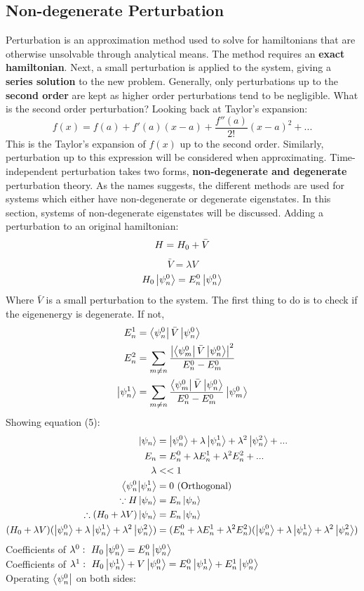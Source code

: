 \documentclass{article}
\begin{document}
\begin{flushleft}
\subsection{Non-degenerate Perturbation}
Perturbation is an approximation method used to solve for hamiltonians that are otherwise unsolvable through analytical means. The method requires an \textbf{exact hamiltonian}. Next, a small perturbation is applied to the system, giving a \textbf{series solution} to the new problem. Generally, only perturbations up to the \textbf{second order} are kept as higher order perturbations tend to be negligible. What is the second order perturbation? Looking back at Taylor's expansion:
$$f(x)=f(a)+f'(a)(x-a)+\frac{f''(a)}{2!}(x-a)^2+...$$
This is the Taylor's expansion of $f(x)$ up to the second order. Similarly, perturbation up to this expression will be considered when approximating. Time-independent perturbation takes two forms, \textbf{non-degenerate and degenerate} perturbation theory. As the names suggests, the different methods are used for systems which either have non-degenerate or degenerate eigenstates. In this section, systems of non-degenerate eigenstates will be discussed. Adding a perturbation to an original hamiltonian:
$$H=H_0+\Bar{V}$$
$$\bar{V}=\lambda V$$
$$H_0\ket{\psi_n^0}=E_n^0\ket{\psi_n^0}$$
Where $\bar{V}$ is a small perturbation to the system. The first thing to do is to check if the eigenenergy is degenerate. If not,
\begin{align}
    E_n^1&=\bra{\psi_n^0}\Bar{V}\ket{\psi_n^0}\\
    E_n^2&=\sum_{m\neq n}\frac{\abs{\bra{\psi_m^0}\bar{V}\ket{\psi_n^0}}^2}{E_n^0-E_m^0}\\
    \ket{\psi_n^1}&=\sum_{m\neq n}\frac{\bra{\psi_m^0}\bar{V}\ket{\psi_n^0}}{E_n^0-E_m^0}\ket{\psi_m^0}
\end{align}
Showing equation (5):
\begin{align*}
    \ket{\psi_n}&=\ket{\psi_n^0}+\lambda\ket{\psi_n^1}+\lambda^2\ket{\psi_n^2}+...\\
    E_n&=E_n^0+\lambda E_n^1+\lambda^2 E_n^2+...\\
    \lambda&<<1\\
    \bra{\psi_n^0}\ket{\psi_n^1}&=0\ \text{(Orthogonal)}\\
    \because H\ket{\psi_n}&=E_n\ket{\psi_n}\\
    \therefore (H_0+\lambda V)\ket{\psi_n}&=E_n\ket{\psi_n}\\
    (H_0+\lambda V)(\ket{\psi_n^0}+\lambda\ket{\psi_n^1}+\lambda^2\ket{\psi_n^2})&=(E_n^0+\lambda E_n^1+\lambda^2 E_n^2)(\ket{\psi_n^0}+\lambda\ket{\psi_n^1}+\lambda^2\ket{\psi_n^2})\\
    \end{align*}
Coefficients of $\lambda^0:\ H_0\ket{\psi_n^0}=E_n^0\ket{\psi_n^0}$\\
Coefficients of $\lambda^1:\ H_0\ket{\psi_n^1}+V\ket{\psi_n^0}=E_n^0\ket{\psi_n^1}+E_n^1\ket{\psi_n^0}$\\
\pagebreak
Operating $\bra{\psi_n^0}$ on both sides:


\end{flushleft}
\end{document}

